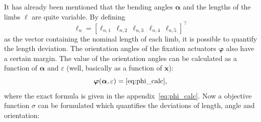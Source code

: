 \documentclass[letterpaper,10pt,conference]{ieeeconf}  %
\begin{document}


It has already been mentioned that the bending angles $\bm{\alpha}$ and the lengths of the limbs $\bm{\ell}$ are quite variable. 
By defining 
\begin{equation}
\bm{\ell}_n = \left[ \ell_{n,1}~\ell_{n,2}~\ell_{n,3}~\ell_{n,4}~\ell_{n,5} \right]^\top
\end{equation}
as the vector containing the nominal length of each limb, it is possible to quantify the length deviation.
The orientation angles of the fixation actuators $\bm{\varphi}$ also have a certain margin.
The value of the orientation angles can be calculated as a function of $\bm{\alpha}$ and $\varepsilon$ (well, basically as a function of $\bm{x}$):
\begin{equation}
\bm{\varphi}(\bm{\alpha}, \varepsilon) = \eqref{eq:phi_calc},
\end{equation}
where the exact formula is given in the appendix~\eqref{eq:phi_calc}.
Now a objective function $\sigma$ can be formulated which quantifies the deviations of length, angle and orientation:
\end{document}
